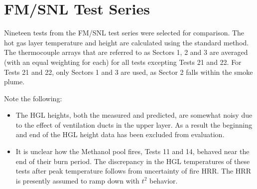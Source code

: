 %


\clearpage

\section{FM/SNL Test Series}

Nineteen tests from the FM/SNL test series were selected for comparison. The hot gas layer temperature and height are calculated using the
standard method. The thermocouple arrays that are referred to as Sectors 1, 2 and 3 are averaged (with an equal weighting for each) for all tests excepting Tests 21 and 22. For Tests 21 and 22, only Sectors 1 and 3 are used, as Sector 2 falls within the smoke plume.

Note the following:
\begin{itemize}
\item The HGL heights, both the measured and predicted, are somewhat noisy due to the effect of ventilation ducts in the upper layer. As a result the beginning and end of the HGL height data has been excluded from evaluation.
\item It is unclear how the Methanol pool fires, Tests 11 and 14, behaved  near the end of their burn period. The discrepancy in the HGL temperatures of these tests after peak temperature follows from uncertainty of fire HRR. The HRR is presently assumed to ramp down with $ t^2$ behavior.
\end{itemize}

